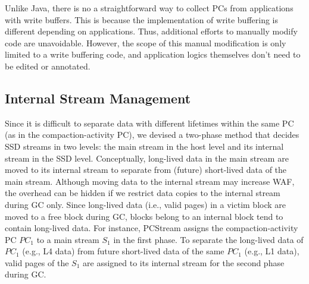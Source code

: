 Unlike Java, there is no a straightforward way to collect PCs from applications
with write buffers. This is because the implementation of write buffering is
different depending on applications. Thus, additional efforts to manually
modify code are unavoidable. However, the scope of this manual modification is
only limited to a write buffering code, and application logics themselves don't
need to be edited or annotated.

\subsection{Internal Stream Management}
{\color{blue}
Since it is difficult to separate data with different lifetimes within the same PC 
(as in the compaction-activity PC), we devised a two-phase method that decides SSD 
streams in two levels: the main stream in the host level and 
its internal stream in the SSD level.
Conceptually, long-lived data in the main stream are moved to its internal stream to 
separate from (future) short-lived data of the main stream.
Although moving data to the internal stream may increase WAF,
the overhead can be hidden if we restrict data copies to the internal stream during GC only.
Since long-lived data (i.e., valid pages) in a victim block are moved to a free block during GC, 
blocks belong to an internal block tend to contain long-lived data.
For instance, \textsf{\small PCStream} assigns the compaction-activity PC {\it $PC_1$} to a
main stream {\it $S_1$} in the first phase.
To separate the long-lived data of {\it $PC_1$} (e.g., L4 data) 
from future short-lived data of the same {\it $PC_1$} (e.g., L1 data), 
valid pages of the {\it $S_1$} are assigned to its internal stream for the second phase during GC.
}




